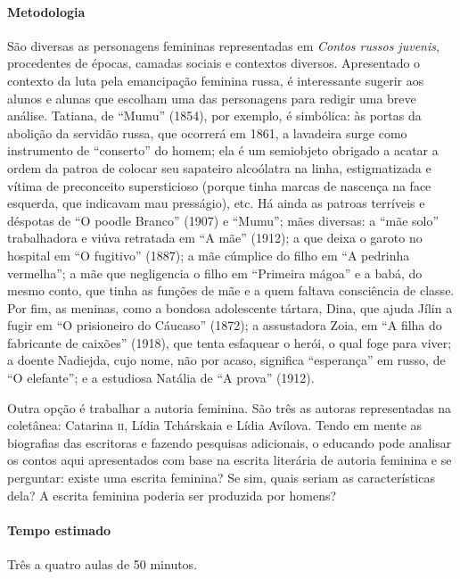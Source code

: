 \documentclass[11pt]{extarticle}
\begin{document}

\paragraph{Metodologia}
São diversas as personagens femininas representadas em \emph{Contos
russos juvenis}, procedentes de épocas, camadas sociais e contextos
diversos. Apresentado o contexto da luta pela emancipação feminina
russa, é interessante sugerir aos alunos e alunas que escolham uma das
personagens para redigir uma breve análise. Tatiana, de ``Mumu'' (1854),
por exemplo, é simbólica: às portas da abolição da servidão russa, que
ocorrerá em 1861, a lavadeira surge como instrumento de ``conserto'' do
homem; ela é um semiobjeto obrigado a acatar a ordem da patroa de
colocar seu sapateiro alcoólatra na linha, estigmatizada e vítima de
preconceito supersticioso (porque tinha marcas de nascença na face
esquerda, que indicavam mau presságio), etc. Há ainda as patroas
terríveis e déspotas de ``O poodle Branco'' (1907) e ``Mumu''; mães
diversas: a ``mãe solo'' trabalhadora e viúva retratada em ``A mãe''
(1912); a que deixa o garoto no hospital em ``O fugitivo'' (1887); a mãe
cúmplice do filho em ``A pedrinha vermelha''; a mãe que negligencia o
filho em ``Primeira mágoa'' e a babá, do mesmo conto, que tinha
as funções de mãe e a quem faltava consciência de classe. Por fim, as
meninas, como a bondosa adolescente tártara, Dina, que ajuda Jílin a
fugir em ``O prisioneiro do Cáucaso'' (1872); a assustadora Zoia,
em ``A filha do fabricante de caixões'' (1918), que tenta
esfaquear o herói, o qual foge para viver; a doente Nadiejda, cujo nome,
não por acaso, significa ``esperança'' em russo, de ``O
elefante''; e a estudiosa Natália de ``A prova'' (1912).

Outra opção é trabalhar a autoria feminina. São três as autoras
representadas na coletânea: Catarina \textsc{ii}, Lídia Tchárskaia e Lídia
Avílova. Tendo em mente as biografias das escritoras e fazendo pesquisas
adicionais, o educando pode analisar os contos aqui apresentados com
base na escrita literária de autoria feminina e se perguntar: existe uma
escrita feminina? Se sim, quais seriam as características dela? A
escrita feminina poderia ser produzida por homens?


\paragraph{Tempo estimado} Três a quatro aulas de 50 minutos.
\end{document}
